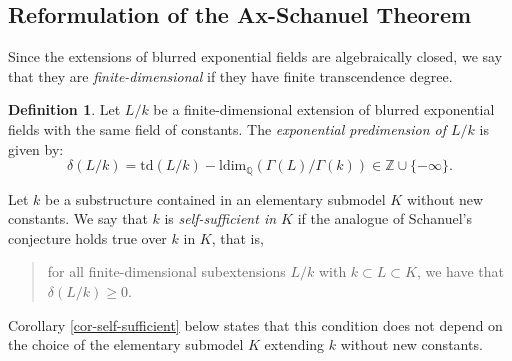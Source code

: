 \documentclass[12pt]{amsart}
\theoremstyle{definition}
\newtheorem{defn}{Definition}[section]
\theoremstyle{plain}
\theoremstyle{exampstyle}\newtheorem{thmx}{Theorem}
\theoremstyle{exampstyle}\newtheorem{thmxbis}{Theorem}
\begin{document}
\subsection{Reformulation of the Ax-Schanuel Theorem}  Since the extensions of blurred exponential fields are algebraically closed, we say that they are {\em finite-dimensional} if they have finite transcendence degree.

\begin{defn}
Let $L/k$ be a finite-dimensional extension of blurred exponential fields with the same field of constants. The {\em exponential predimension of $L/k$} is given by:
$$ \delta(L/k) = \mathrm{td}(L/k) - \mathrm{ldim}_\mathbb{Q}(\Gamma(L)/\Gamma(k)) \in \mathbb{Z} \cup \lbrace - \infty \rbrace.$$

 Let $k$ be a substructure contained in an elementary submodel $K$ without new constants. We say that $k$ is {\em self-sufficient in $K$} if the analogue of Schanuel's conjecture holds true over $k$ in $K$, that is,
\begin{quote}
for all finite-dimensional subextensions $L/k$ with $k \subset L \subset K$, we have that $\delta(L/k) \geq 0$.
\end{quote}
\end{defn}
\noindent Corollary \ref{cor-self-sufficient} below states that this condition does not depend on the choice of the elementary submodel $K$ extending $k$ without new constants. 
\end{document}
